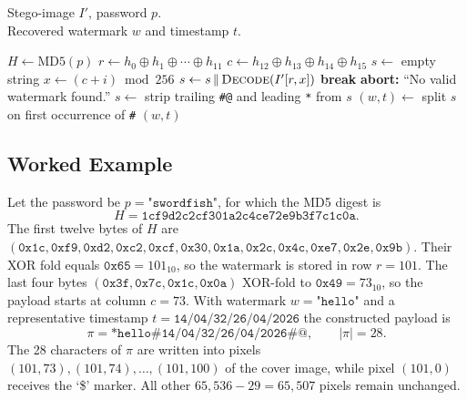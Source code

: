 \begin{algorithm}[H]
    \RaggedRight
    \caption{Row-based LSB watermark extraction}
    \label{alg:extract}
    \algorithmicrequire \quad Stego-image $I'$, password $p$. \\
    \algorithmicensure \quad Recovered watermark $w$ and timestamp $t$.

    \begin{algorithmic}[1]
        \State $H \gets \mathrm{MD5}(p)$
        \State $r \gets h_0 \oplus h_1 \oplus \cdots \oplus h_{11}$
        \State $c \gets h_{12} \oplus h_{13} \oplus h_{14} \oplus h_{15}$
        \State $s \gets$ empty string
            \State $x \gets (c + i) \bmod 256$
            \State $s \gets s \,\Vert\, \textsc{Decode}(I'[r, x])$
                \State \textbf{break}
            \EndIf
        \EndFor
            \State \textbf{abort:} ``No valid watermark found.''
        \EndIf
        \State $s \gets$ strip trailing \texttt{\#@} and leading \texttt{*} from $s$
        \State $(w, t) \gets$ split $s$ on first occurrence of \texttt{\#}
        \State \Return $(w, t)$
    \end{algorithmic}
\end{algorithm}

\subsection{Worked Example}

Let the password be $p = \texttt{"swordfish"}$, for which the MD5 digest is
\[
    H = \texttt{1cf9d2c2cf301a2c4ce72e9b3f7c1c0a}.
\]
The first twelve bytes of $H$ are $(\mathtt{0x1c}, \mathtt{0xf9}, \mathtt{0xd2}, \mathtt{0xc2}, \mathtt{0xcf}, \mathtt{0x30}, \mathtt{0x1a}, \mathtt{0x2c}, \mathtt{0x4c}, \mathtt{0xe7}, \mathtt{0x2e}, \mathtt{0x9b})$. Their XOR fold equals $\mathtt{0x65} = 101_{10}$, so the watermark is stored in row $r = 101$. The last four bytes $(\mathtt{0x3f}, \mathtt{0x7c}, \mathtt{0x1c}, \mathtt{0x0a})$ XOR-fold to $\mathtt{0x49} = 73_{10}$, so the payload starts at column $c = 73$. With watermark $w = \texttt{"hello"}$ and a representative timestamp $t = \texttt{14/04/32/26/04/2026}$ the constructed payload is
\[
    \pi = \texttt{*hello\#14/04/32/26/04/2026\#@}, \qquad |\pi| = 28.
\]
The 28 characters of $\pi$ are written into pixels $(101, 73), (101, 74), \ldots, (101, 100)$ of the cover image, while pixel $(101, 0)$ receives the `\$' marker. All other $65{,}536 - 29 = 65{,}507$ pixels remain unchanged.

